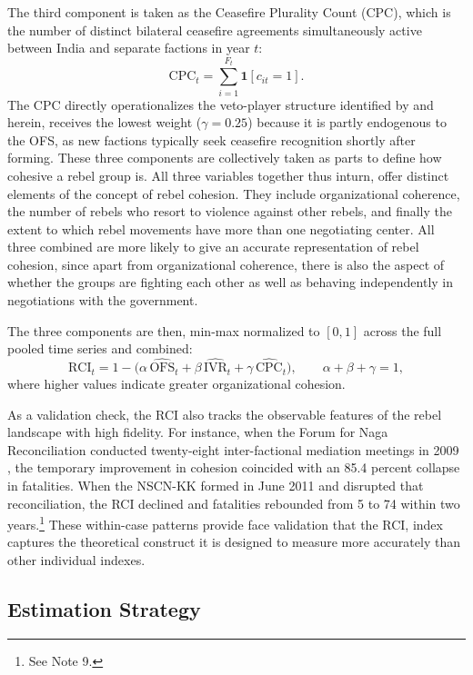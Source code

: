 \documentclass[12pt,a4paper]{article}
\begin{document}
The third component is taken as the Ceasefire Plurality Count (CPC), which is the number of distinct bilateral ceasefire agreements simultaneously active between India and separate factions in year $t$:
\begin{equation}
\mathrm{CPC}_t = \sum_{i=1}^{F_t} \mathbf{1}[c_{it} = 1].
\end{equation}
The CPC directly operationalizes the veto-player structure identified by \citet{cunningham2006,cunningham2009} and herein, receives the lowest weight ($\gamma = 0.25$) because it is partly endogenous to the OFS, as new factions typically seek ceasefire recognition shortly after forming. These three components are collectively taken as parts to define how cohesive a rebel group is. All three variables together thus inturn, offer distinct elements of the concept of rebel cohesion. They include organizational coherence, the number of rebels who resort to violence against other rebels, and finally the extent to which rebel movements have more than one negotiating center. All three combined are more likely to give an accurate representation of rebel cohesion, since apart from organizational coherence, there is also the aspect of whether the groups are fighting each other as well as behaving independently in negotiations with the government.

The three components are then, min-max normalized to $[0,1]$ across the full pooled time series and combined:
\begin{equation}
\mathrm{RCI}_t = 1 - \bigl(\alpha\,\widehat{\mathrm{OFS}}_t + \beta\,\widehat{\mathrm{IVR}}_t + \gamma\,\widehat{\mathrm{CPC}}_t\bigr),
\qquad \alpha + \beta + \gamma = 1,
\end{equation}
where higher values indicate greater organizational cohesion.

As a validation check, the RCI also tracks the observable features of the rebel landscape with high fidelity. For instance, when the Forum for Naga Reconciliation conducted twenty-eight inter-factional mediation meetings in 2009 \citep{idsa2009}, the temporary improvement in cohesion coincided with an 85.4 percent collapse in fatalities. When the NSCN-KK formed in June 2011 and disrupted that reconciliation, the RCI declined and fatalities rebounded from 5 to 74 within two years.\footnote{See Note 9.} These within-case patterns provide face validation that the RCI, index captures the theoretical construct it is designed to measure more accurately than other individual indexes.

\subsection{Estimation Strategy}
\end{document}
